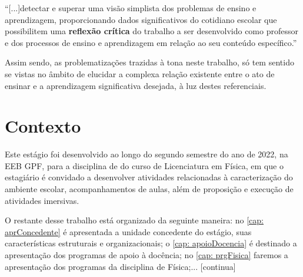 \begin{citacao}
``[...]detectar e superar uma visão simplista dos problemas de ensino e aprendizagem, proporcionando dados significativos do cotidiano escolar que possibilitem uma \textbf{reflexão crítica} do trabalho a ser desenvolvido como professor e dos processos de ensino e aprendizagem em relação ao seu conteúdo específico.'' \cite[p. 11, \textbf{grifos meus}]{CARVALHO:2012} 
\end{citacao}
Assim sendo, as problematizações trazidas à tona neste trabalho, só tem sentido se vistas no âmbito de elucidar a complexa relação existente entre o ato de ensinar e a aprendizagem significativa desejada, à luz destes referenciais.

\section{Contexto}
Este estágio foi desenvolvido ao longo do segundo semestre do ano de 2022, na \ac{EEB} \ac{GPF}, para a disciplina de \disciplina \; do curso de Licenciatura em Física, em que o estagiário é convidado a desenvolver atividades relacionadas à caracterização do ambiente escolar, acompanhamentos de aulas, além de proposição e execução de atividades imersivas.
 
O restante desse trabalho está organizado da seguinte maneira: no \autoref{cap: aprConcedente} é apresentada a unidade concedente do estágio, suas características estruturais e organizacionais; o \autoref{cap: apoioDocencia} é destinado a apresentação dos programas de apoio à docência; no \autoref{cap: prgFisica} faremos a apresentação dos programas da disciplina de Física;... [continua] %

